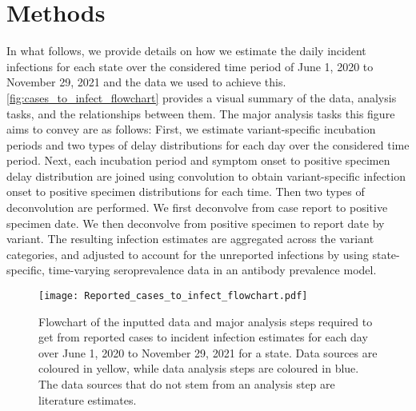 \section{Methods}
\label{sec:methods}


In what follows, we provide details on how we estimate the daily incident
infections for each state over the considered time period of June 1, 2020 to
November 29, 2021 and the data we used to achieve this.
\autoref{fig:cases_to_infect_flowchart} provides a visual summary of the data,
analysis tasks, and the relationships between them. The major analysis tasks
this figure aims to convey are as follows: First, we estimate variant-specific
incubation periods and two types of delay distributions for each day over the
considered time period. Next, each incubation period and symptom onset to
positive specimen delay distribution are joined using convolution to obtain
variant-specific infection onset to positive specimen distributions for each
time. Then two types of deconvolution are performed. We first deconvolve from
case report to positive specimen date. We then deconvolve from positive specimen
to report date by variant. The resulting infection estimates are aggregated
across the variant categories, and adjusted to account for the unreported
infections by using state-specific, time-varying seroprevalence data in an
antibody prevalence model. 


\begin{figure}[!tb]
\centering
    \texttt{[image: Reported\_cases\_to\_infect\_flowchart.pdf]} 
    \caption{Flowchart of the inputted data and major analysis steps required to
    get from reported cases to incident infection estimates for each day over
    June 1, 2020 to November 29, 2021 for a state. Data sources are coloured in
    yellow, while data analysis steps are coloured in blue. The data sources
    that do not stem from an analysis step are literature estimates.}
    \label{fig:cases_to_infect_flowchart}
\end{figure}









